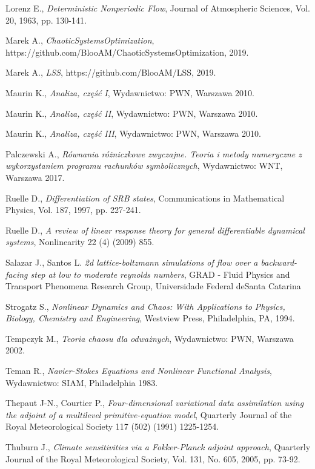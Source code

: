 \documentclass[12pt, twoside]{book}
\begin{document}
\begin{thebibliography}{99}
 Lorenz E.,
\emph{Deterministic Nonperiodic Flow},
Journal of Atmospheric Sciences, Vol. 20, 1963, pp. 130-141.

 Marek A.,
\emph{ChaoticSystemsOptimization},
https://github.com/BlooAM/ChaoticSystemsOptimization, 2019.

 Marek A.,
\emph{LSS},
https://github.com/BlooAM/LSS, 2019.

 Maurin K.,
\emph{Analiza, część I},
Wydawnictwo: PWN, Warszawa 2010.

 Maurin K.,
\emph{Analiza, część II},
Wydawnictwo: PWN, Warszawa 2010.

 Maurin K.,
\emph{Analiza, część III},
Wydawnictwo: PWN, Warszawa 2010.

 Palczewski A.,
\emph{Równania różniczkowe zwyczajne. Teoria i metody numeryczne z wykorzystaniem programu rachunków symbolicznych},
Wydawnictwo: WNT, Warszawa 2017.

 Ruelle D.,
\emph{Differentiation of SRB states},
Communications in Mathematical Physics, Vol. 187, 1997, pp. 227-241.

 Ruelle D.,
\emph{ A review of linear response theory for general differentiable dynamical systems},
Nonlinearity 22 (4) (2009) 855.

 Salazar J., Santos L.
\emph{2d lattice-boltzmann simulations of flow over a backward-facing step at low to moderate reynolds numbers},
GRAD - Fluid Physics and Transport Phenomena Research Group, Universidade Federal deSanta Catarina
	
 Strogatz S., 
\emph{Nonlinear Dynamics and Chaos: With Applications to Physics, Biology, Chemistry and Engineering},
Westview Press, Philadelphia, PA, 1994.  

 Tempczyk M., 
\emph{Teoria chaosu dla odważnych},
Wydawnictwo: PWN, Warszawa 2002.

 Teman R., 
\emph{Navier-Stokes Equations and Nonlinear Functional Analysis},
Wydawnictwo: SIAM, Philadelphia 1983.
	
 Thepaut J-N., Courtier P., 
\emph{Four-dimensional variational data assimilation using the adjoint of a multilevel primitive-equation model},
Quarterly Journal of the Royal Meteorological Society 117 (502) (1991) 1225-1254.

 Thuburn J.,
\emph{Climate sensitivities via a Fokker-Planck adjoint approach},
Quarterly Journal of the Royal Meteorological Society, Vol. 131, No. 605, 2005, pp. 73-92.


\end{thebibliography}
\end{document}
